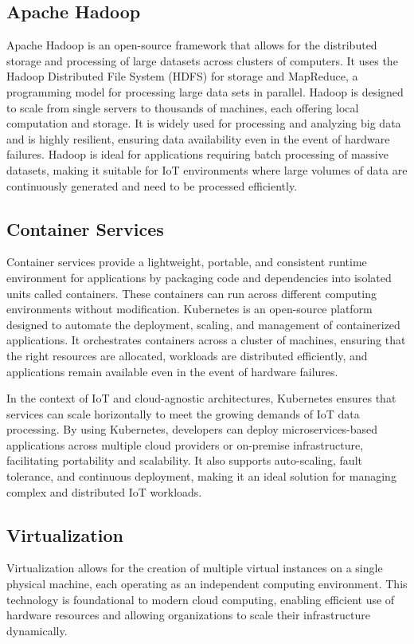 \subsection*{Apache Hadoop}
\label{sec:apache-hadoop}
Apache Hadoop\cite{site:hadoop} is an open-source framework that allows for the distributed storage and processing of large datasets across clusters of computers. It uses the Hadoop Distributed File System (HDFS) for storage and MapReduce, a programming model for processing large data sets in parallel. Hadoop is designed to scale from single servers to thousands of machines, each offering local computation and storage. It is widely used for processing and analyzing big data and is highly resilient, ensuring data availability even in the event of hardware failures. Hadoop is ideal for applications requiring batch processing of massive datasets, making it suitable for IoT environments where large volumes of data are continuously generated and need to be processed efficiently.

\subsection*{Container Services}
\label{sec:container-kubernetes}
Container services provide a lightweight, portable, and consistent runtime environment for applications by packaging code and dependencies into isolated units called containers. These containers can run across different computing environments without modification. Kubernetes\cite{site:kubernetes} is an open-source platform designed to automate the deployment, scaling, and management of containerized applications. It orchestrates containers across a cluster of machines, ensuring that the right resources are allocated, workloads are distributed efficiently, and applications remain available even in the event of hardware failures.

In the context of IoT and cloud-agnostic architectures, Kubernetes ensures that services can scale horizontally to meet the growing demands of IoT data processing. By using Kubernetes, developers can deploy microservices-based applications across multiple cloud providers or on-premise infrastructure, facilitating portability and scalability. It also supports auto-scaling, fault tolerance, and continuous deployment, making it an ideal solution for managing complex and distributed IoT workloads.

\subsection*{Virtualization}
\label{sec:virtualization}
Virtualization allows for the creation of multiple virtual instances on a single physical machine, each operating as an independent computing environment. This technology is foundational to modern cloud computing, enabling efficient use of hardware resources and allowing organizations to scale their infrastructure dynamically.

